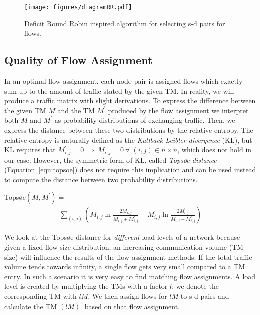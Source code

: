 \documentclass[journal,10pt]{IEEEtran}
\begin{document}
		\begin{figure}[t]
			\centering
			\texttt{[image: figures/diagramRR.pdf]}
	        \caption{Deficit Round Robin inspired algorithm for selecting s-d pairs for flows.}
    		    \label{alg:srcdst}
		\end{figure}
		
\subsection{Quality of Flow Assignment}

In an optimal flow assignment, each node pair is assigned flows which
exactly sum up to the amount of traffic stated by the given TM.
In reality, we will produce a traffic matrix with slight derivations.
To express the difference between the given TM $M$ and the TM $M^\prime$ produced by the flow assignment
we interpret both $M$ and $M^\prime$ as probability distributions of exchanging traffic.
Then, we express the distance between these two distributions by the relative entropy.
The relative entropy is naturally defined as the \emph{Kullback-Leibler divergence} (KL), but KL requires that 
$M^\prime_{i,j}=0~\Rightarrow~M_{i,j}=0~\forall~(i,j)\in n \times n$, which does not hold in our case. 
However, the symmetric form of KL, called \emph{Topsøe distance} (Equation~\ref{equ:topsoe}) \cite{johnson2001symmetrizing}
does not require this implication and can be used instead to compute the distance between two probability distributions.

\vspace{0.3cm}

Topsøe$(M, M^{\prime})  =$
\begin{eqnarray}
	\label{equ:topsoe}
	\sum_{(i,j)} 
		\left(	
			M_{i,j} \ln \frac{2 M_{i,j}}{M_{i,j} + M^{\prime}_{i,j}} + 
			M^{\prime}_{i,j} \ln \frac{2 M^{\prime}_{i,j}}{M_{i,j} + M^{\prime}_{i,j}} 
		\right)
\end{eqnarray}

We look at the Topsøe distance for \emph{different} load levels of a network because
given a fixed flow-size distribution, an increasing communication volume (TM size) will influence the results of the flow assignment methods:
If the total traffic volume tends towards infinity, a single flow gets very small compared to a TM entry.
In such a scenario it is very easy to find matching flow assignments.
A load level is created by multiplying the TMs with a factor $l$;
we denote the corresponding TM with $lM$.
We then assign flows for $lM$ to s-d pairs and calculate the TM $(lM)^{\prime}$ based on that flow assignment.
\end{document}

